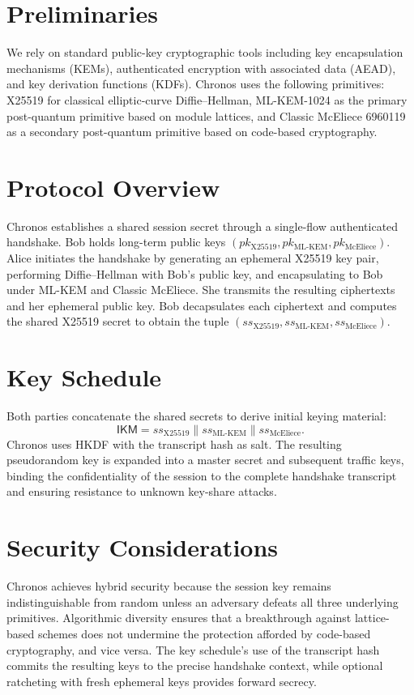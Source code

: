 \documentclass[runningheads]{llncs}
\begin{document}
\section{Preliminaries}
We rely on standard public-key cryptographic tools including key encapsulation mechanisms (KEMs), authenticated encryption with associated data (AEAD), and key derivation functions (KDFs). Chronos uses the following primitives: X25519 for classical elliptic-curve Diffie--Hellman, ML-KEM-1024 as the primary post-quantum primitive based on module lattices, and Classic McEliece 6960119 as a secondary post-quantum primitive based on code-based cryptography.

\section{Protocol Overview}
Chronos establishes a shared session secret through a single-flow authenticated handshake. Bob holds long-term public keys $(pk_{\text{X25519}}, pk_{\text{ML-KEM}}, pk_{\text{McEliece}})$. Alice initiates the handshake by generating an ephemeral X25519 key pair, performing Diffie--Hellman with Bob's public key, and encapsulating to Bob under ML-KEM and Classic McEliece. She transmits the resulting ciphertexts and her ephemeral public key. Bob decapsulates each ciphertext and computes the shared X25519 secret to obtain the tuple $(ss_{\text{X25519}}, ss_{\text{ML-KEM}}, ss_{\text{McEliece}})$.

\section{Key Schedule}
Both parties concatenate the shared secrets to derive initial keying material:
\begin{equation}
    \mathsf{IKM} = ss_{\text{X25519}} \parallel ss_{\text{ML-KEM}} \parallel ss_{\text{McEliece}}.
\end{equation}
Chronos uses HKDF with the transcript hash as salt. The resulting pseudorandom key is expanded into a master secret and subsequent traffic keys, binding the confidentiality of the session to the complete handshake transcript and ensuring resistance to unknown key-share attacks.

\section{Security Considerations}
Chronos achieves hybrid security because the session key remains indistinguishable from random unless an adversary defeats all three underlying primitives. Algorithmic diversity ensures that a breakthrough against lattice-based schemes does not undermine the protection afforded by code-based cryptography, and vice versa. The key schedule's use of the transcript hash commits the resulting keys to the precise handshake context, while optional ratcheting with fresh ephemeral keys provides forward secrecy.
\end{document}
